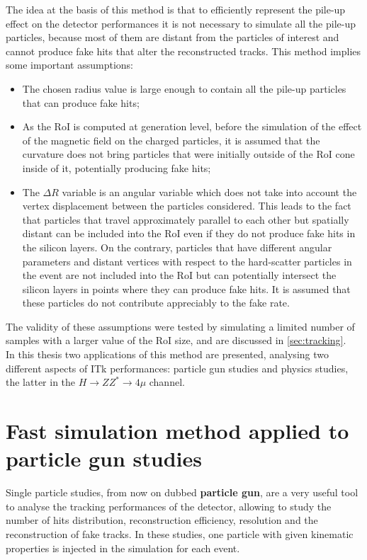\documentclass[a4paper,twoside,12pt]{book}
\begin{document}
The idea at the basis of this method is that to efficiently represent the pile-up effect on the
detector performances it is not necessary to simulate all the pile-up particles, because most 
of them are distant from the particles of interest and cannot produce fake hits that 
alter the reconstructed tracks. This 
method implies some important assumptions:
\begin{itemize}
\item The chosen radius value is large enough to contain all the pile-up particles that can produce
fake hits;
\item As the RoI is computed at generation level, before the simulation of the effect of the
magnetic field on the charged particles, it is assumed that the curvature does not bring
particles that were initially outside of the RoI cone inside of it, potentially producing fake hits;
\item The $\Delta R$ variable is an angular variable which does not take into account the vertex displacement between the particles considered. This leads to the fact that particles 
that travel approximately parallel to each other but spatially distant can be included into the
RoI even if they do not produce fake hits in the silicon layers. On the contrary, particles that 
have different angular parameters and distant vertices with respect to the hard-scatter
particles in the event are not included into the RoI but can potentially intersect the silicon 
layers in points where they can produce fake hits. It is assumed that these particles do 
not contribute appreciably to the fake rate.
\end{itemize}

The validity of these assumptions were tested by simulating a limited number of samples with
a larger value of the RoI size, and are discussed in \ref{sec:tracking}.\\

In this thesis two applications of this method are presented, analysing two different aspects
of ITk performances: particle gun studies and physics studies, the latter
in the $H \rightarrow ZZ^{*} \rightarrow 4\mu$ channel. \\


\section{Fast simulation method applied to particle gun studies}\label{sec:simulation:pg}

Single particle studies, from now on dubbed \textbf{particle gun}, are a very useful tool to analyse the tracking performances of the
detector, allowing to study the number of hits distribution, reconstruction efficiency, resolution and the reconstruction of fake tracks. In these studies, one particle with given kinematic properties is injected in the simulation for each event.\\
\end{document}
